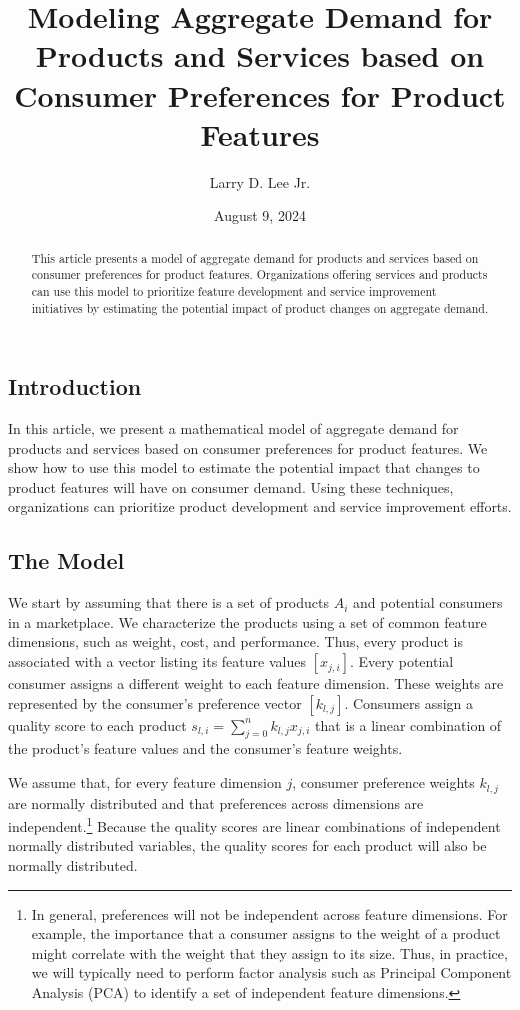 \documentclass[]{article}
\title{Modeling Aggregate Demand for Products and Services based on Consumer Preferences for Product Features}
\author{Larry D. Lee Jr.}
\date{August 9, 2024}
\begin{document}
\maketitle

\begin{abstract}
This article presents a model of aggregate demand for products
and services based on consumer preferences for product features.
Organizations offering services and products can use this model to
prioritize feature development and service improvement initiatives by
estimating the potential impact of product changes on aggregate demand.
\end{abstract}

\hypertarget{introduction}{%
\subsection{Introduction}\label{introduction}}

In this article, we present a mathematical model of aggregate demand for
products and services based on consumer preferences for product
features. We show how to use this model to estimate the potential impact
that changes to product features will have on consumer demand. Using
these techniques, organizations can prioritize product development and
service improvement efforts.

\hypertarget{the-model}{%
\subsection{The Model}\label{the-model}}

We start by assuming that there is a set of products \(A_i\) and
potential consumers in a marketplace. We characterize the products using
a set of common feature dimensions, such as weight, cost, and
performance. Thus, every product is associated with a vector listing its
feature values \([x_{j,i}]\). Every potential consumer assigns a
different weight to each feature dimension. These weights are
represented by the consumer's preference vector \([k_{l,j}]\). Consumers
assign a quality score to each product
\(s_{l,i} = \sum_{j=0}^n k_{l,j} x_{j,i}\) that is a linear combination
of the product's feature values and the consumer's feature weights.

We assume that, for every feature dimension \(j\), consumer preference
weights \(k_{l,j}\) are normally distributed and that preferences across
dimensions are independent.\footnote{In general, preferences will not be
  independent across feature dimensions. For example, the importance
  that a consumer assigns to the weight of a product might correlate
  with the weight that they assign to its size. Thus, in practice, we
  will typically need to perform factor analysis such as Principal
  Component Analysis (PCA) to identify a set of independent feature
  dimensions.} Because the quality scores are linear combinations of
independent normally distributed variables, the quality scores for each
product will also be normally distributed.
\end{document}
